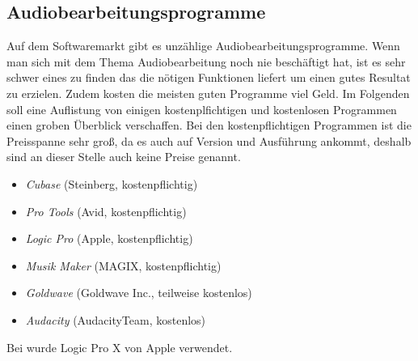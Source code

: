 \subsection{Audiobearbeitungsprogramme}
Auf dem Softwaremarkt gibt es unzählige Audiobearbeitungsprogramme. Wenn man sich mit dem Thema Audiobearbeitung noch nie beschäftigt hat, ist es sehr schwer eines zu finden das die nötigen Funktionen liefert um einen gutes Resultat zu erzielen. Zudem kosten die meisten guten Programme viel Geld. Im Folgenden soll eine Auflistung von einigen kostenplfichtigen und kostenlosen Programmen einen groben Überblick verschaffen. Bei den kostenpflichtigen Programmen ist die Preisspanne sehr groß, da es auch auf Version und Ausführung ankommt, deshalb sind an dieser Stelle auch keine Preise genannt.

\begin{itemize}
 \item \textit{Cubase} (Steinberg, kostenpflichtig)
 \item \textit{Pro Tools} (Avid, kostenpflichtig)
 \item \textit{Logic Pro} (Apple, kostenpflichtig)
 \item \textit{Musik Maker} (MAGIX, kostenpflichtig)
 \item \textit{Goldwave} (Goldwave Inc., teilweise kostenlos)
 \item \textit{Audacity} (AudacityTeam, kostenlos)
 \end{itemize} 

Bei \gamename wurde Logic Pro X von Apple verwendet. 
